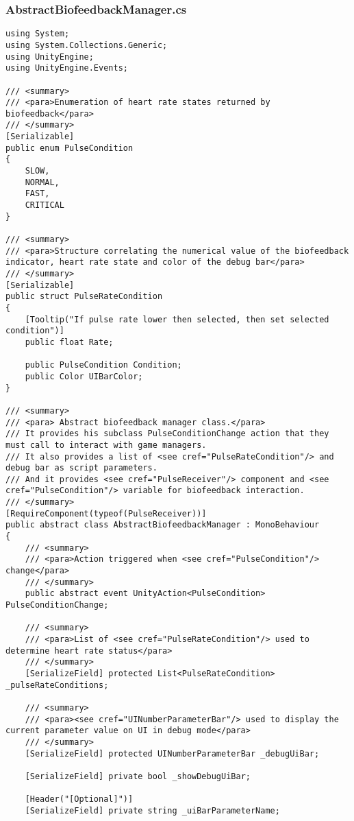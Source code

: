 \subsubsection*{AbstractBiofeedbackManager.cs}
\begin{verbatim}
using System;
using System.Collections.Generic;
using UnityEngine;
using UnityEngine.Events;

/// <summary>
/// <para>Enumeration of heart rate states returned by biofeedback</para>
/// </summary>
[Serializable]
public enum PulseCondition
{
    SLOW,
    NORMAL,
    FAST,
    CRITICAL
}

/// <summary>
/// <para>Structure correlating the numerical value of the biofeedback indicator, heart rate state and color of the debug bar</para>
/// </summary>
[Serializable]
public struct PulseRateCondition
{
    [Tooltip("If pulse rate lower then selected, then set selected condition")]
    public float Rate;

    public PulseCondition Condition;
    public Color UIBarColor;
}

/// <summary>
/// <para> Abstract biofeedback manager class.</para>
/// It provides his subclass PulseConditionChange action that they must call to interact with game managers.
/// It also provides a list of <see cref="PulseRateCondition"/> and debug bar as script parameters.
/// And it provides <see cref="PulseReceiver"/> component and <see cref="PulseCondition"/> variable for biofeedback interaction.
/// </summary>
[RequireComponent(typeof(PulseReceiver))]
public abstract class AbstractBiofeedbackManager : MonoBehaviour
{
    /// <summary>
    /// <para>Action triggered when <see cref="PulseCondition"/> change</para>
    /// </summary>
    public abstract event UnityAction<PulseCondition> PulseConditionChange;

    /// <summary>
    /// <para>List of <see cref="PulseRateCondition"/> used to determine heart rate status</para>
    /// </summary>
    [SerializeField] protected List<PulseRateCondition> _pulseRateConditions;

    /// <summary>
    /// <para><see cref="UINumberParameterBar"/> used to display the current parameter value on UI in debug mode</para>
    /// </summary>
    [SerializeField] protected UINumberParameterBar _debugUiBar;

    [SerializeField] private bool _showDebugUiBar;

    [Header("[Optional]")] 
    [SerializeField] private string _uiBarParameterName;


\end{verbatim}

